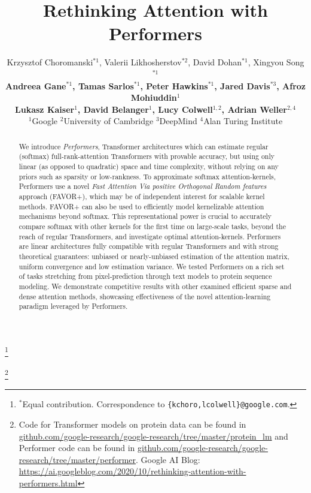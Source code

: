 \documentclass{article}
\title{Rethinking Attention with Performers}
\author{Krzysztof Choromanski$^{*1}$, Valerii Likhosherstov$^{*2}$, David Dohan$^{*1}$, Xingyou Song$^{*1}$ \\ 
  \textbf{Andreea Gane$^{*1}$,  Tamas Sarlos$^{*1}$,  Peter Hawkins$^{*1}$, Jared Davis$^{*3}$, Afroz Mohiuddin$^{1}$} \\
  \textbf{Lukasz Kaiser$^{1}$, David Belanger$^{1}$, Lucy Colwell$^{1,2}$, Adrian Weller$^{2,4}$} \\
  $^1$Google $^2$University of Cambridge $^3$DeepMind $^4$Alan Turing Institute \\
}
\theoremstyle{slanted}
\newcommand\blfootnote[1]{%
  \begingroup
  \renewcommand\thefootnote{}\footnote{#1}%
  \addtocounter{footnote}{-1}%
  \endgroup
}
\begin{document}
\maketitle
\vspace{-0.8cm}
\begin{abstract}
\vspace{-0.3cm}
We introduce \textit{Performers}, Transformer architectures which can estimate regular (softmax) full-rank-attention Transformers with provable accuracy, but using only linear (as opposed to quadratic) space and time complexity, without relying on any priors such as sparsity or low-rankness. To approximate softmax attention-kernels, Performers use a novel \textit{Fast Attention Via positive Orthogonal Random features} approach (FAVOR+), which may be of independent interest for scalable kernel methods. FAVOR+ can also be used to efficiently model kernelizable attention mechanisms beyond softmax. This representational power is crucial to accurately compare softmax with other kernels for the first time on large-scale tasks, beyond the reach of regular Transformers, and investigate optimal attention-kernels. Performers are linear architectures fully compatible with regular Transformers and with strong theoretical guarantees: unbiased or nearly-unbiased estimation of the attention matrix, uniform convergence and low  estimation variance. We tested Performers on a rich set of tasks stretching from pixel-prediction through text models to protein sequence modeling. We demonstrate competitive results with other examined efficient sparse and dense attention methods, showcasing effectiveness of the novel attention-learning paradigm leveraged by Performers. 

\end{abstract}

\blfootnote{$^\ast$Equal contribution. Correspondence to \texttt{\{kchoro,lcolwell\}@google.com}.}

\blfootnote{Code for Transformer models on protein data can be found in \textcolor{blue}{\url{github.com/google-research/google-research/tree/master/protein_lm}} and Performer code can be found in \textcolor{blue}{\url{github.com/google-research/google-research/tree/master/performer}}. Google AI Blog: \textcolor{blue}{\url{https://ai.googleblog.com/2020/10/rethinking-attention-with-performers.html}}}
\vspace{-1.5cm}






%

\newpage


\newpage



\newpage


\end{document}
